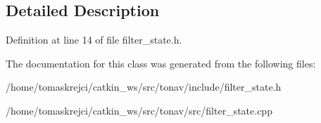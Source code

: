 \subsection{Detailed Description}


Definition at line 14 of file filter\-\_\-state.\-h.



The documentation for this class was generated from the following files\-:\begin{DoxyCompactItemize}
\item 
/home/tomaskrejci/catkin\-\_\-ws/src/tonav/include/filter\-\_\-state.\-h\item 
/home/tomaskrejci/catkin\-\_\-ws/src/tonav/src/filter\-\_\-state.\-cpp\end{DoxyCompactItemize}

